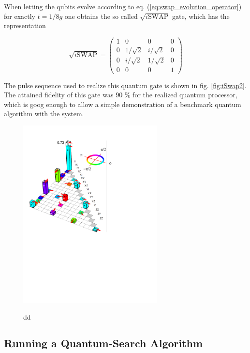 When letting the qubits evolve according to eq. (\ref{eq:swap_evolution_operator}) for exactly $t = 1/8g$ one obtains the so called $\sqrt{i\mathrm{SWAP}}$ gate, which has the representation

\begin{equation}
	\sqrt{i\mathrm{SWAP}}  =  \left( \begin{array}{cccc} 1 & 0 & 0 & 0 \\ 0 & 1/\sqrt{2} & i/\sqrt{2} & 0 \\ 0 & i/\sqrt{2} & 1/\sqrt{2} & 0 \\ 0 & 0 & 0 & 1 \end{array} \right) \label{eq:sqrt_iswap_gate}
\end{equation}

The pulse sequence used to realize this quantum gate is shown in fig. \ref{fig:iSwap2}.  The attained fidelity of this gate was 90 \% for the realized quantum processor, which is goog enough to allow a simple demonstration of a benchmark quantum algorithm with the system.

\begin{figure}
		\includegraphics[width=0.65\textwidth]{./material/papers/iswap/figures/chi_matrix}
	\label{fig:GateChiMatrixAndErrorProcess}
	\caption{dd}
\end{figure}

\subsection{Running a Quantum-Search Algorithm}

